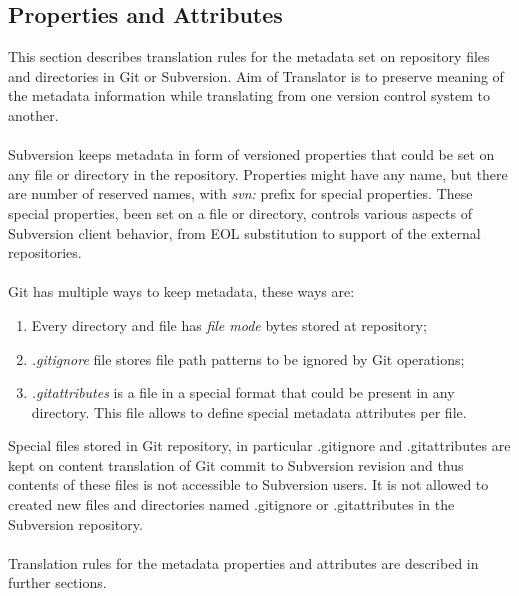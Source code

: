 \subsection{Properties and Attributes}
This section describes translation rules for the metadata set on repository files and directories in Git or Subversion.
Aim of Translator is to preserve meaning of the metadata information while translating from one version control system
to another.
\\\\
Subversion keeps metadata in form of versioned properties that could be set on any file or directory in the repository.
Properties might have any name, but there are number of reserved names, with \emph{svn:} prefix for special properties. 
These special properties, been set on a file or directory, controls various aspects of Subversion client behavior, 
from EOL substitution to support of the external repositories.
\\\\
Git has multiple ways to keep metadata, these ways are:
\begin{enumerate}
\compactlist
\item Every directory and file has \emph{file mode} bytes stored at repository;
\item \emph{.gitignore} file stores file path patterns to be ignored by Git operations;
\item \emph{.gitattributes} is a file in a special format that could be present in any directory.
This file allows to define special metadata attributes per file.
\end{enumerate}

Special files stored in Git repository, in particular .gitignore and .gitattributes are kept
on content translation of Git commit to Subversion revision and thus contents of these files is not 
accessible to Subversion users. It is not allowed to created new files and directories named
.gitignore or .gitattributes in the Subversion repository.
\\\\
Translation rules for the metadata properties and attributes are described in further sections.

